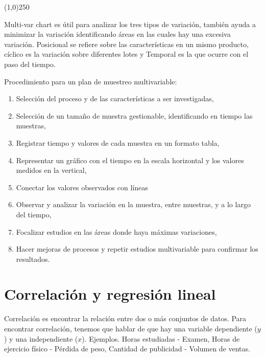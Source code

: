 \documentclass[oneside]{book}
\begin{document}
\begin{center}
	\line(1,0){250}
\end{center}


Multi-var chart es útil para analizar los tres tipos de variación, también ayuda a minimizar la variación identificando áreas en las cuales hay una excesiva variación.
Posicional se refiere sobre las características en un mismo producto, cíclico es la variación sobre diferentes lotes y Temporal es la que ocurre con el paso del tiempo.


Procedimiento para un plan de muestreo multivariable:

\begin{enumerate}
	\item Selección del proceso y de las características a ser investigadas,
	\item Selección de un tamaño de muestra gestionable, identificando en tiempo las muestras,
	\item Registrar tiempo y valores de cada muestra en un formato tabla,
	\item Representar un gráfico con el tiempo en la escala horizontal y los valores medidos en la vertical,
	\item Conectar los valores observados con líneas
	\item Observar y analizar la variación en la muestra, entre muestras, y a lo largo del tiempo,
	\item Focalizar estudios en las áreas donde haya máximas variaciones,
	\item Hacer mejoras de procesos y repetir estudios multivariable para confirmar los resultados.
\end{enumerate}

\section{Correlación y regresión lineal}

Correlación es encontrar la relación entre dos o más conjuntos de datos. Para encontrar correlación, tenemos que hablar de que hay una variable dependiente ($y$) y una independiente ($x$). Ejemplos. Horas estudiadas - Examen, Horas de ejercicio físico - Pérdida de peso, Cantidad de publicidad - Volumen de ventas.
\end{document}
